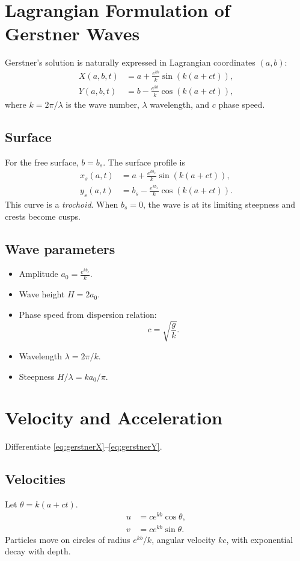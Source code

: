 \documentclass[11pt]{article}
\begin{document}
\section{Lagrangian Formulation of Gerstner Waves}
Gerstner’s solution is naturally expressed in Lagrangian coordinates $(a,b)$:
\begin{align}
X(a,b,t) &= a + \frac{e^{k b}}{k}\sin(k(a+ct)), \label{eq:gerstnerX}\\
Y(a,b,t) &= b - \frac{e^{k b}}{k}\cos(k(a+ct)), \label{eq:gerstnerY}
\end{align}
where $k=2\pi/\lambda$ is the wave number, $\lambda$ wavelength, and $c$ phase speed.

\subsection{Surface}
For the free surface, $b=b_s$. The surface profile is
\begin{align}
x_s(a,t) &= a + \frac{e^{kb_s}}{k}\sin(k(a+ct)), \\
y_s(a,t) &= b_s - \frac{e^{kb_s}}{k}\cos(k(a+ct)).
\end{align}
This curve is a \emph{trochoid}. When $b_s=0$, the wave is at its limiting steepness and crests become cusps.

\subsection{Wave parameters}
\begin{itemize}
\item Amplitude $a_0 = \tfrac{e^{kb_s}}{k}$.
\item Wave height $H = 2 a_0$.
\item Phase speed from dispersion relation:
\begin{equation}
c = \sqrt{\frac{g}{k}}.
\end{equation}
\item Wavelength $\lambda = 2\pi/k$.
\item Steepness $H/\lambda = k a_0/\pi$.
\end{itemize}

\section{Velocity and Acceleration}
Differentiate \eqref{eq:gerstnerX}--\eqref{eq:gerstnerY}.

\subsection{Velocities}
Let $\theta=k(a+ct)$.
\begin{align}
u &= c e^{kb}\cos\theta, \\
v &= c e^{kb}\sin\theta.
\end{align}
Particles move on circles of radius $e^{kb}/k$, angular velocity $kc$, with exponential decay with depth.
\end{document}
